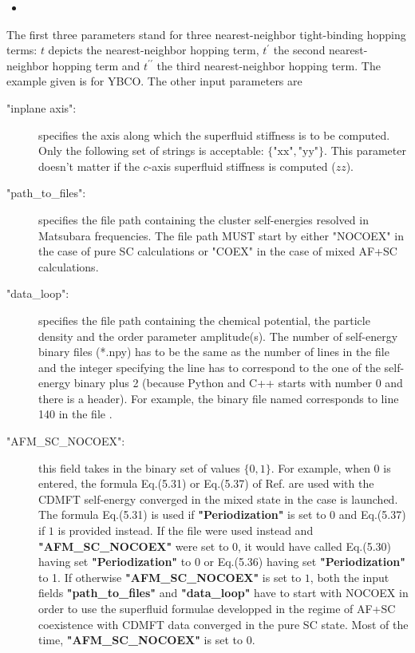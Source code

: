 \documentclass{article}
\newcommand{\juliascript}[4]{
\begin{itemize}
\item[]
\end{itemize}
}
\begin{document}
\juliascript{params.json}{Content of params.json}{1}{17}

The first three parameters stand for three nearest-neighbor tight-binding hopping terms: $t$ depicts the nearest-neighbor hopping term, $t^{\prime}$ the second nearest-neighbor hopping term and $t^{\prime\prime}$ the third nearest-neighbor hopping term. The example given is for YBCO. The other input parameters are 


\begin{description}
\item["inplane axis":] specifies the axis along which the superfluid stiffness is to be computed. Only the following set of strings is acceptable: $\{\text{"xx"},\text{"yy"}\}$. This parameter doesn't matter if the $c$-axis superfluid stiffness is computed ($zz$).
%
\item["path\_to\_files":] specifies the file path containing the cluster self-energies resolved in Matsubara frequencies. The file path MUST start by either "NOCOEX" in the case of pure SC calculations or "COEX" in the case of mixed AF+SC calculations.
%
\item["data\_loop":] specifies the file path containing the chemical potential, the particle density  and the order parameter amplitude(s). The number of self-energy binary files (*.npy) has to be the same as the number of lines in the  file and the integer specifying the line has to correspond to the one of the self-energy binary plus 2 (because Python and C++ starts with number $0$ and there is a header). For example, the binary file named  corresponds to line 140 in the file .
%
\item["AFM\_SC\_NOCOEX":] this field takes in the binary set of values $\{0,1\}$. For example, when $0$ is entered, the formula Eq.(5.31) or Eq.(5.37) of Ref.\cite{simard_master} are used with the CDMFT self-energy converged in the mixed state in the case  is launched. The formula Eq.(5.31) is used if \textbf{"Periodization"} is set to $0$ and Eq.(5.37) if $1$ is provided instead. If the file  were used instead and \textbf{"AFM\_SC\_NOCOEX"} were set to 0, it would have called Eq.(5.30) having set \textbf{"Periodization"} to $0$ or Eq.(5.36) having set \textbf{"Periodization"} to 1. If otherwise \textbf{"AFM\_SC\_NOCOEX"} is set to $1$, both the input fields \textbf{"path\_to\_files"} and \textbf{"data\_loop"} have to start with NOCOEX in order to use the superfluid formulae developped in the regime of AF+SC coexistence with CDMFT data converged in the pure SC state. Most of the time, \textbf{"AFM\_SC\_NOCOEX"} is set to $0$.

\end{description}
\end{document}
